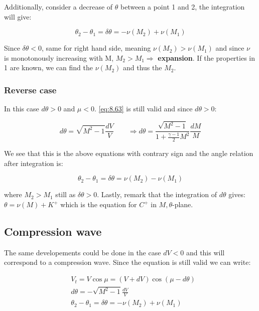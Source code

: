 	Additionally, consider a decrease of $\theta$ between a point 1 and 2, the integration will give: 
	
	\begin{equation}
	\theta _2 - \theta _1 = \delta \theta = -\nu (M_2) + \nu (M_1)
	\end{equation}
	
	Since $\delta \theta < 0$, same for right hand side, meaning $\nu (M_2)>\nu (M_1)$ and since $\nu$ is monotonously increasing with M, $M_2 > M_1 \Rightarrow$ \textbf{expansion}. If the properties in 1 are known, we can find the $\nu (M_2)$ and thus the $M_2$. 
	
	\subsubsection{Reverse case}
	
	In this case $d\theta > 0$ and $\mu < 0$. \autoref{eq:8.63} is still valid and since $d\theta > 0$: 
	
	\begin{equation}
	d\theta = \sqrt{M^2-1}\frac{dV}{V} \qquad \Rightarrow d\theta = \frac{\sqrt{M^2 -1}}{1+\frac{\gamma -1}{2} M^2}\frac{dM}{M}
	\end{equation}
	
	We see that this is the above equations with contrary sign and the angle relation after integration is: 
	
	\begin{equation}
	\theta _2 - \theta _1 = \delta \theta = \nu (M_2) - \nu (M_1)
	\end{equation}
	
	where $M_2 > M_1$ still as $\delta \theta > 0$. Lastly, remark that the integration of $d\theta$ gives: $\theta = \nu (M) + K^+$ which is the equation for $C^+$ in $M,\theta$-plane. 
	
\subsection{Compression wave}
	The same developements could be done in the case $dV < 0$ and this will correspond to a compression wave. Since the equation is still valid we can write: 
	
	\begin{equation}
	\begin{aligned}
	&V_t = V\cos \mu = (V+dV) \cos (\mu - d\theta) \\
	&d\theta = - \sqrt{M^2 - 1} \frac{dV}{V} \\
	&\theta _2 - \theta _1 = \delta \theta = -\nu (M_2) + \nu (M_1)
	\end{aligned}
	\end{equation}
	
